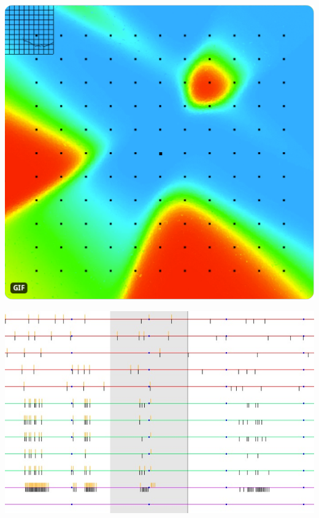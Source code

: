 \documentclass[../resume.tex]{subfiles}
\begin{document}
\href{https://twitter.com/randompast/status/718903342773116928}{\includegraphics[scale=0.15]{../scientific/mlp.png}}

\includegraphics[scale=0.45]{../scientific/preview_7-22-17.jpg} 

\newpage
\end{document}
